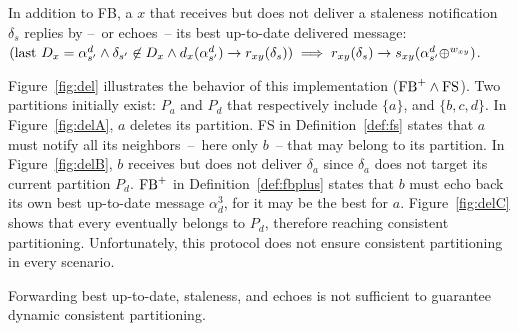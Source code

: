 \begin{definition}
  In addition to FB, a \process $x$ that receives but does not deliver
  a staleness notification $\delta_{s}$ replies by --~or echoes~-- its
  best up-to-date delivered message:\\$(\textup{last}~ D_x = \alpha_{s'}^d
  \wedge \delta_{s'} \not\in D_x \wedge d_x(\alpha_{s'}^d)\rightarrow
  r_{xy}(\delta_{s})) \implies r_{xy}(\delta_{s}) \rightarrow
  s_{xy}(\alpha_{s'}^d\oplus^{w_{xy}})$.
\end{definition}


Figure~\ref{fig:del} illustrates the behavior of this implementation
($\textup{FB}^+ \wedge \textup{FS}$).  Two partitions initially exist:
$P_a$ and $P_d$ that respectively include $\{a\}$, and $\{b, c,
d\}$. In Figure~\ref{fig:delA}, $a$ deletes its partition. FS in
Definition~\ref{def:fs} states that $a$ must notify all its
neighbors~--~here only $b$~-- that may belong to its partition.  In
Figure~\ref{fig:delB}, $b$ receives but does not deliver $\delta_a$
since $\delta_a$ does not target its current partition $P_d$.
$\textup{FB}^+$ in Definition~\ref{def:fbplus} states that $b$ must
echo back its own best up-to-date message $\alpha_d^3$, for it may be
the best for $a$. Figure~\ref{fig:delC} shows that every \process eventually belongs to 
$P_d$, therefore reaching consistent
partitioning. Unfortunately, this protocol does not ensure consistent
partitioning in every scenario.


\begin{lemma} Forwarding best up-to-date,
  staleness, and echoes is not sufficient to guarantee dynamic
  consistent partitioning.
\end{lemma}

